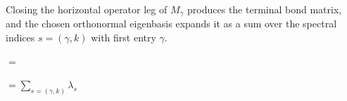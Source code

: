 Closing the horizontal operator leg of $M_\gamma$ produces the terminal bond
matrix, and the chosen orthonormal eigenbasis expands it as a sum over the
spectral indices $s=(\gamma,k)$ with first entry $\gamma$.
\begin{tenkzequation}
    \tenkzkernel
    \begin{tenkz}[rows={op}, cols=1, boundary=periodic]
    \end{tenkz}
    \quad$=$\quad
    \begin{tenkz}[rows={op}, cols=1]
    \end{tenkz}
    \quad$=\displaystyle\sum_{s=(\gamma,k)}\lambda_{s}$\quad
    \begin{tenkz}[rows={op}, cols=1]
    \end{tenkz}
\end{tenkzequation}

